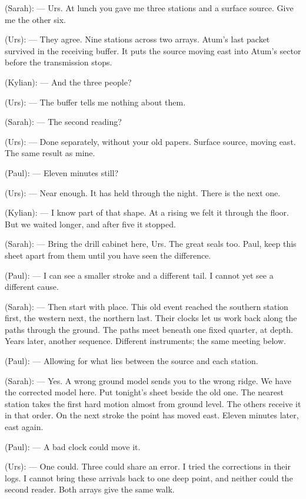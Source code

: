 
\begin{room}

(Sarah): --- Urs. At lunch you gave me three stations and a surface source. Give me the other six.

(Urs): --- They agree. Nine stations across two arrays. Atum's last packet survived in the receiving buffer. It puts the source moving east into Atum's sector before the transmission stops.

(Kylian): --- And the three people?

(Urs): --- The buffer tells me nothing about them.

(Sarah): --- The second reading?

(Urs): --- Done separately, without your old papers. Surface source, moving east. The same result as mine.

(Paul): --- Eleven minutes still?

(Urs): --- Near enough. It has held through the night. There is the next one.

(Kylian): --- I know part of that shape. At a rising we felt it through the floor. But we waited longer, and after five it stopped.

(Sarah): --- Bring the drill cabinet here, Urs. The great seals too. Paul, keep this sheet apart from them until you have seen the difference.

(Paul): --- I can see a smaller stroke and a different tail. I cannot yet see a different cause.

(Sarah): --- Then start with place. This old event reached the southern station first, the western next, the northern last. Their clocks let us work back along the paths through the ground. The paths meet beneath one fixed quarter, at depth. Years later, another sequence. Different instruments; the same meeting below.

(Paul): --- Allowing for what lies between the source and each station.

(Sarah): --- Yes. A wrong ground model sends you to the wrong ridge. We have the corrected model here. Put tonight's sheet beside the old one. The nearest station takes the first hard motion almost from ground level. The others receive it in that order. On the next stroke the point has moved east. Eleven minutes later, east again.

(Paul): --- A bad clock could move it.

(Urs): --- One could. Three could share an error. I tried the corrections in their logs. I cannot bring these arrivals back to one deep point, and neither could the second reader. Both arrays give the same walk.


\end{room}
